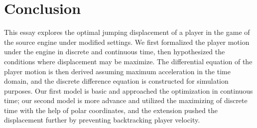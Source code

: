

\section{Conclusion}
This essay explores the optimal jumping displacement of a player in the game of the source engine under modified settings. We first formalized the player motion under the engine in discrete and continuous time, then hypothesized the conditions where displacement may be maximize. The differential equation of the player motion is then derived assuming maximum acceleration in the time domain, and the discrete difference equation is constructed for simulation purposes. Our first model is basic and approached the optimization in continuous time; our second model is more advance and utilized the maximizing of discrete time with the help of polar coordinates, and the extension pushed the displacement further by preventing backtracking player velocity.


